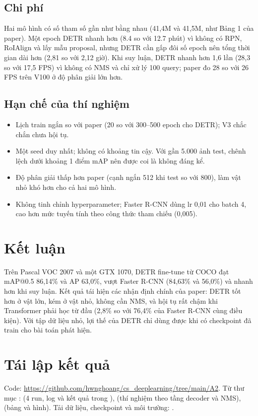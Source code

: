 \documentclass[11pt, a4paper]{article}
\begin{document}
\subsection{Chi phí}
Hai mô hình có số tham số gần như bằng nhau (41,4M và 41,5M, như Bảng 1 của paper). Một epoch DETR nhanh hơn (8.4 so với 12.7 phút) vì không có RPN, RoIAlign và lấy mẫu proposal, nhưng DETR cần gấp đôi số epoch nên tổng thời gian dài hơn (2,81 so với 2,12 giờ). Khi suy luận, DETR nhanh hơn 1,6 lần (28,3 so với 17,5 FPS) vì không có NMS và chỉ xử lý 100 query; paper đo 28 so với 26 FPS trên V100 ở độ phân giải lớn hơn.

\subsection{Hạn chế của thí nghiệm}
\begin{itemize}
  \item Lịch train ngắn so với paper (20 so với 300--500 epoch cho DETR); V3 chắc chắn chưa hội tụ.
  \item Một seed duy nhất; không có khoảng tin cậy. Với gần 5.000 ảnh test, chênh lệch dưới khoảng 1 điểm mAP nên được coi là không đáng kể.
  \item Độ phân giải thấp hơn paper (cạnh ngắn 512 khi test so với 800), làm vật nhỏ khó hơn cho cả hai mô hình.
  \item Không tinh chỉnh hyperparameter; Faster R-CNN dùng lr 0,01 cho batch 4, cao hơn mức tuyến tính theo công thức tham chiếu (0,005).
\end{itemize}

\section{Kết luận}
Trên Pascal VOC 2007 và một GTX 1070, DETR fine-tune từ COCO đạt mAP@0.5 86,14\% và AP 63,0\%, vượt Faster R-CNN (84,63\% và 56,0\%) và nhanh hơn khi suy luận. Kết quả tái hiện các nhận định chính của paper: DETR tốt hơn ở vật lớn, kém ở vật nhỏ, không cần NMS, và hội tụ rất chậm khi Transformer phải học từ đầu (2,8\% so với 76,4\% của Faster R-CNN cùng điều kiện). Với tập dữ liệu nhỏ, lợi thế của DETR chỉ dùng được khi có checkpoint đã train cho bài toán phát hiện.

\section*{Tái lập kết quả}
Code: \url{https://github.com/hwnghoang/cs_deeplearning/tree/main/A2}. Từ thư mục :  (4 run, log và kết quả trong ),  (thí nghiệm theo tầng decoder và NMS),  (bảng và hình). Tải dữ liệu, checkpoint và môi trường: .



\end{document}
